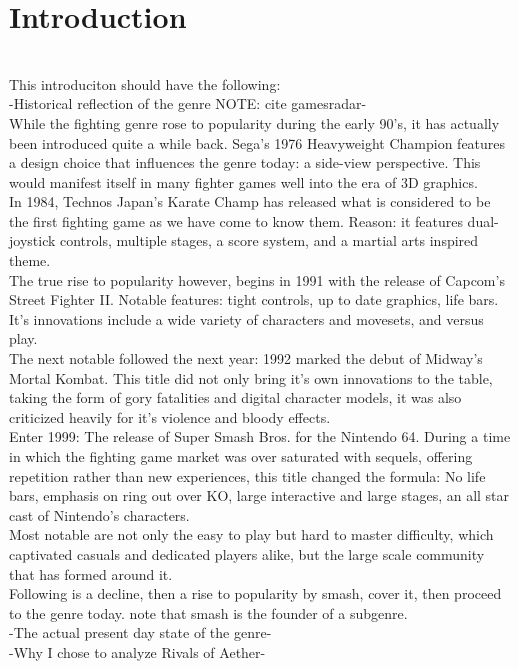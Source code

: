 \documentclass[11pt]{article}
\begin{document}
\chapter{Introduction}\\
This introduciton should have the following:\\
-Historical reflection of the genre NOTE: cite gamesradar-\\
While the fighting genre rose to popularity during the early 90's, it has actually been introduced quite a while back. Sega's 1976 Heavyweight Champion features a design choice that influences the genre today: a side-view perspective. This would manifest itself in many fighter games well into the era of 3D graphics.\\
In 1984, Technos Japan's Karate Champ has released what is considered to be the first fighting game as we have come to know them. Reason: it features dual-joystick controls, multiple stages, a score system, and a martial arts inspired theme.\\
The true rise to popularity however, begins in 1991 with the release of Capcom's Street Fighter II. Notable features: tight controls, up to date graphics, life bars. It's innovations include a wide variety of characters and movesets, and versus play.\\
The next notable followed the next year: 1992 marked the debut of Midway's Mortal Kombat. This title did not only bring it's own innovations to the table, taking the form of gory fatalities and digital character models, it was also criticized heavily for it's violence and bloody effects.\\
Enter 1999: The release of Super Smash Bros. for the Nintendo 64. During a time in which the fighting game market was over saturated with sequels, offering repetition rather than new experiences, this title changed the formula: No life bars, emphasis on ring out over KO, large interactive and large stages, an all star cast of Nintendo's characters.\\
Most notable are not only the easy to play but hard to master difficulty, which captivated casuals and dedicated players alike, but the large scale community that has formed around it.\\
Following is a decline, then a rise to popularity by smash, cover it, then proceed to the genre today. note that smash is the founder of a subgenre.\\
-The actual present day state of the genre-\\
-Why I chose to analyze Rivals of Aether-\\
\end{document}
